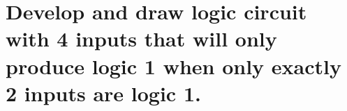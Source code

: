 \section{Develop and draw logic circuit with 4 inputs that will only produce logic 1 when only exactly 2 inputs are logic 1.}